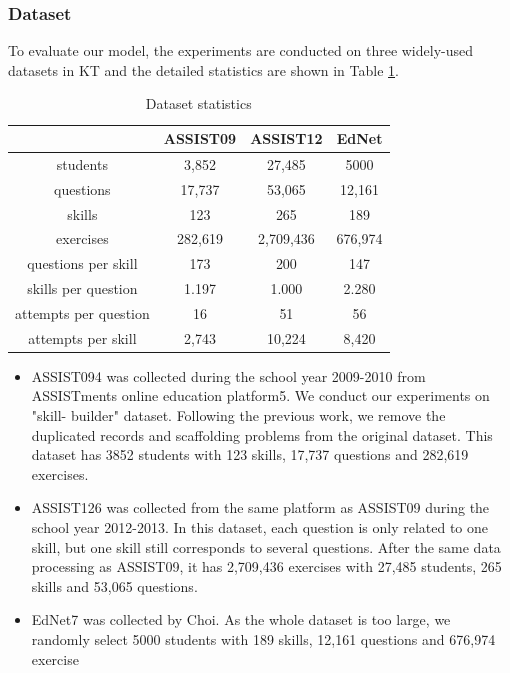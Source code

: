 \documentclass[11pt,en]{elegantpaper}
\begin{document}
\subsubsection{Dataset}
To evaluate our model, the experiments are conducted on three widely-used datasets in KT and the detailed statistics are shown in Table \ref{datasetstb1}.
\begin{table}[h]
	\centering
	\caption{Dataset statistics}
	\label{datasetstb1}
	\begin{tabular}{cccc}
	
		\hline & ASSIST09 & ASSIST12 & EdNet \\
		\hline students & 3,852 & 27,485 & 5000 \\
		questions & 17,737 & 53,065 & 12,161 \\
		skills & 123 & 265 & 189 \\
		exercises & 282,619 & 2,709,436 & 676,974 \\
		questions per skill & 173 & 200 & 147 \\
		skills per question & 1.197 & 1.000 & 2.280 \\
		attempts per question & 16 & 51 & 56 \\
		attempts per skill & 2,743 & 10,224 & 8,420 \\
		\hline
	\end{tabular}
\end{table}
\begin{itemize}
	\item ASSIST094 was collected during the school year 2009-2010 from ASSISTments online education platform5. We conduct our experiments on "skill- builder" dataset. Following the previous work, we remove the duplicated records and scaffolding problems from the original dataset. This dataset has 3852 students with 123 skills, 17,737 questions and 282,619 exercises.
	\item ASSIST126 was collected from the same platform as ASSIST09 during the school year 2012-2013. In this dataset, each question is only related to one skill, but one skill still corresponds to several questions. After the same data processing as ASSIST09, it has 2,709,436 exercises with 27,485 students, 265 skills and 53,065 questions.
	\item EdNet7 was collected by Choi. As the whole dataset is too large, we randomly select 5000 students with 189 skills, 12,161 questions and 676,974 exercise
\end{itemize}
\end{document}
